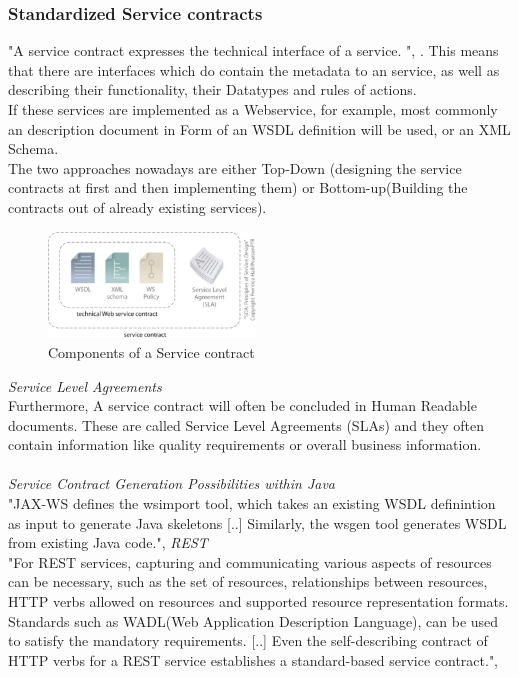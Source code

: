 \documentclass[12pt]{article}
\begin{document}
\subsubsection{Standardized Service contracts}
\label{sec:StandardizedServicecontracts}
"A service contract expresses the technical interface of a service. ", \cite[page 33]{grau}. This means that there are interfaces which do contain the metadata to an service, as well as describing their functionality, their Datatypes and rules of actions. \cite[page 86]{te} \\ If these services are implemented as a Webservice, for example, most commonly an description document in Form of an WSDL definition will be used, or an XML Schema. \\
The two approaches nowadays are either Top-Down (designing the service contracts at first and then implementing them) or Bottom-up(Building the contracts out of already existing services). \cite[page 151,152]{grau}
\begin{figure}[here!]
	\centering
	\includegraphics[width=0.49\textwidth]{images/soajuhu}
	\caption{Components of a Service contract \cite{photos}}
	\label{fig:goalssoa}
	\end{figure}
\FloatBarrier
 \noindent\textit{Service Level Agreements} \\
Furthermore, A service contract will often be concluded in Human Readable documents. These are called Service Level Agreements (SLAs) and they often contain information like quality requirements or overall business information. 
\\ \\
\textit{Service Contract Generation Possibilities within Java} \\
"JAX-WS defines the wsimport tool, which takes an existing WSDL definintion as input to generate Java skeletons [..] Similarly, the wsgen tool generates WSDL from existing Java code.",\cite[page 151]{grau}
\newpage \noindent\textit{REST}\\
"For REST services, capturing and communicating various aspects of resources can be necessary, such as the set of resources, relationships between resources, HTTP verbs allowed on resources and supported resource representation formats. Standards such as WADL(Web Application Description Language), can be used to satisfy the mandatory requirements. [..] Even the self-describing contract of HTTP verbs for a REST service establishes a standard-based service contract.", \cite[page 151]{grau}
\end{document}
